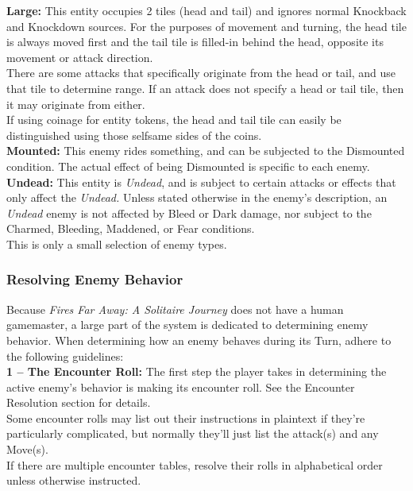 \documentclass[12pt]{article}
\begin{document}
\begin{multicols*}{2}
\textbf{Large:} This entity occupies 2 tiles (head and tail) and ignores normal Knockback and Knockdown sources. For the purposes of movement and turning, the head tile is always moved first and the tail tile is filled-in behind the head, opposite its movement or attack direction.\\
There are some attacks that specifically originate from the head or tail, and use that tile to determine range. If an attack does not specify a head or tail tile, then it may originate from either.\\
If using coinage for entity tokens, the head and tail tile can easily be distinguished using those selfsame sides of the coins.\\

\textbf{Mounted:} This enemy rides something, and can be subjected to the Dismounted condition. The actual effect of being Dismounted is specific to each enemy.\\

\textbf{Undead:} This entity is \emph{Undead}, and is subject to certain attacks or effects that only affect the \emph{Undead.} Unless stated otherwise in the enemy’s description, an \emph{Undead} enemy is not affected by Bleed or Dark damage, nor subject to the Charmed, Bleeding, Maddened, or Fear conditions.\\

This is only a small selection of enemy types.

\subsubsection{Resolving Enemy Behavior}
Because \emph{Fires Far Away: A Solitaire Journey} does not have a human gamemaster, a large part of the system is dedicated to determining enemy behavior. When determining how an enemy behaves during its Turn, adhere to the following guidelines:\\

\textbf{1 -- The Encounter Roll:} The first step the player takes in determining the active enemy’s behavior is making its encounter roll. See the Encounter Resolution section for details.\\
Some encounter rolls may list out their instructions in plaintext if they’re particularly complicated, but normally they’ll just list the attack(s) and any Move(s).\\
If there are multiple encounter tables, resolve their rolls in alphabetical order unless otherwise instructed.\\


\end{multicols*}
\end{document}
